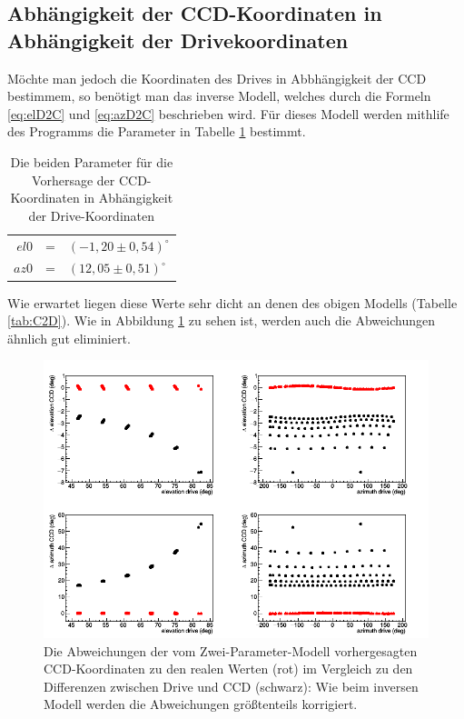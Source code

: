 \subsection{Abhängigkeit der CCD-Koordinaten in Abhängigkeit der Drivekoordinaten}
Möchte man jedoch die Koordinaten des Drives in Abbhängigkeit der CCD bestimmem, so benötigt man das inverse Modell, welches durch die Formeln \ref{eq:elD2C} und \ref{eq:azD2C} beschrieben wird. Für dieses Modell werden mithlife des Programms die Parameter in Tabelle \ref{tab:D2C} bestimmt.
\begin{table}[htbp]
\centering
\begin{tabular}{rcl}
\toprule
$el0$ &=& $(-1,20\pm0,54)^{\circ}$\\
$az0$ &=& $(12,05\pm0,51)^{\circ}$\\
\bottomrule
\end{tabular}
\label{tab:D2C}
\caption{Die beiden Parameter für die Vorhersage der CCD-Koordinaten in Abhängigkeit der Drive-Koordinaten}
\label{tab:D2C}
\end{table}
Wie erwartet liegen diese Werte sehr dicht an denen des obigen Modells (Tabelle \ref{tab:C2D}). Wie in Abbildung \ref{img:D2Ccomp} zu sehen ist, werden auch die Abweichungen ähnlich gut eliminiert. 
\begin{figure}[htbp]
\centering
\includegraphics[width=\textwidth]{../341/D2Ccomp.png}
\caption{Die Abweichungen der vom Zwei-Parameter-Modell vorhergesagten CCD-Koordinaten zu den realen Werten (rot) im Vergleich zu den Differenzen zwischen Drive und CCD (schwarz): Wie beim inversen Modell werden die Abweichungen größtenteils korrigiert.}
\label{img:D2Ccomp}
\end{figure}
